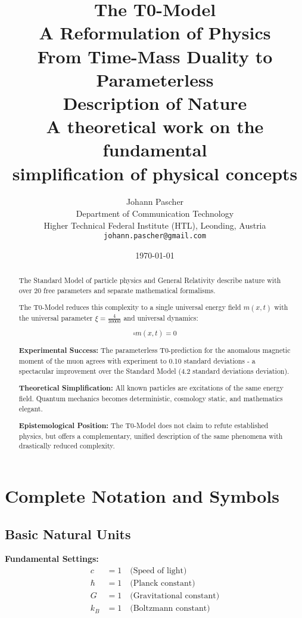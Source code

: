 \documentclass[12pt,a4paper]{report}
\title{
	{\Huge The T0-Model}\\
	{\LARGE A Reformulation of Physics}\\
	{\Large From Time-Mass Duality to Parameterless\\Description of Nature}\\
	\vspace{1cm}
	{\large A theoretical work on the fundamental\\simplification of physical concepts}
}
\author{
	{\Large Johann Pascher}\\
	Department of Communication Technology\\
	Higher Technical Federal Institute (HTL), Leonding, Austria\\
	\texttt{johann.pascher@gmail.com}
}
\date{\today}
\newcommand{\mfield}{m(x,t)}  %
\newcommand{\xipar}{\xi}      %
\begin{document}
	
	\maketitle
	
	\tableofcontents
	
	\begin{abstract}
		The Standard Model of particle physics and General Relativity describe nature with over 20 free parameters and separate mathematical formalisms.
		
		The T0-Model reduces this complexity to a single universal energy field $\mfield$ with the universal parameter $\xipar = \frac{4}{30000}$ and universal dynamics:
		
		\begin{equation}\label{eq:universal_dynamics}
			\square \mfield = 0
		\end{equation}
		
		\textbf{Experimental Success:} The parameterless T0-prediction for the anomalous magnetic moment of the muon agrees with experiment to 0.10 standard deviations - a spectacular improvement over the Standard Model (4.2 standard deviations deviation).
		
		\textbf{Theoretical Simplification:} All known particles are excitations of the same energy field. Quantum mechanics becomes deterministic, cosmology static, and mathematics elegant.
		
		\textbf{Epistemological Position:} The T0-Model does not claim to refute established physics, but offers a complementary, unified description of the same phenomena with drastically reduced complexity.
	\end{abstract}
	
	\chapter*{Complete Notation and Symbols}\label{chap:notation}
	
	\section*{Basic Natural Units}
	\textbf{Fundamental Settings:}
	\begin{align}
		c &= 1 \quad \text{(Speed of light)} \\
		\hbar &= 1 \quad \text{(Planck constant)} \\
		G &= 1 \quad \text{(Gravitational constant)} \\
		k_B &= 1 \quad \text{(Boltzmann constant)}
	\end{align}
	
\end{document}
